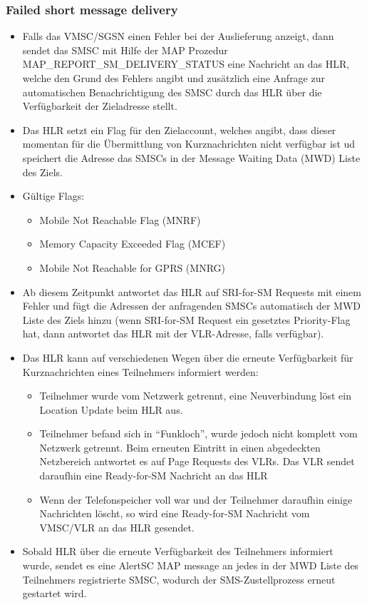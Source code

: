 \documentclass[german,12pt,a4paper]{article}
\begin{document}
\subsubsection{Failed short message delivery}
\begin{itemize}
	\item Falls das VMSC/SGSN einen Fehler bei der Auslieferung anzeigt, dann sendet das SMSC mit Hilfe der MAP Prozedur 
		MAP\_REPORT\_SM\_DELIVERY\_STATUS eine Nachricht an das HLR, welche den Grund des Fehlers angibt und zusätzlich 
		eine Anfrage zur automatischen Benachrichtigung des SMSC durch das HLR über die Verfügbarkeit der Zieladresse stellt.
	\item Das HLR setzt ein Flag für den Zielaccount, welches angibt, dass dieser momentan für die Übermittlung von Kurznachrichten 
		nicht verfügbar ist ud speichert die Adresse das SMSCs in der Message Waiting Data (MWD) Liste des Ziels.
	\item Gültige Flags:
		\begin{itemize}
			\item Mobile Not Reachable Flag (MNRF)
			\item Memory Capacity Exceeded Flag (MCEF)
			\item Mobile Not Reachable for GPRS (MNRG)
		\end{itemize}
	\item Ab diesem Zeitpunkt antwortet das HLR auf SRI-for-SM Requests mit einem Fehler und fügt die Adressen der anfragenden 
		SMSCs automatisch der MWD Liste des Ziels hinzu (wenn SRI-for-SM Request ein gesetztes Priority-Flag hat, dann antwortet 
		das HLR mit der VLR-Adresse, falls verfügbar).
	\item Das HLR kann auf verschiedenen Wegen über die erneute Verfügbarkeit für Kurznachrichten eines Teilnehmers informiert werden:
		\begin{itemize}
			\item Teilnehmer wurde vom Netzwerk getrennt, eine Neuverbindung löst ein Location Update beim HLR aus.
			\item Teilnehmer befand sich in ``Funkloch'', wurde jedoch nicht komplett vom Netzwerk getrennt. Beim erneuten Eintritt in 
				einen abgedeckten Netzbereich antwortet es auf Page Requests des VLRs. Das VLR sendet daraufhin eine Ready-for-SM Nachricht 
				an das HLR
			\item Wenn der Telefonspeicher voll war und der Teilnehmer daraufhin einige Nachrichten löscht, so wird eine Ready-for-SM 
				Nachricht vom VMSC/VLR an das HLR gesendet.
		\end{itemize}
	\item Sobald HLR über die erneute Verfügbarkeit des Teilnehmers informiert wurde, sendet es eine AlertSC MAP message an jedes 
		in der MWD Liste des Teilnehmers registrierte SMSC, wodurch der SMS-Zustellprozess erneut gestartet wird.
\end{itemize}
\end{document}
